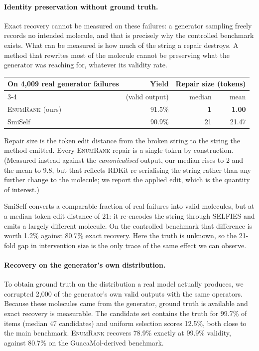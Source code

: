 \documentclass[journal=jcisd8,manuscript=article]{achemso}
\newcommand{\ours}{\textsc{EnumRank}}
\begin{document}
\paragraph{Identity preservation without ground truth.}
Exact recovery cannot be measured on these failures: a generator sampling
freely records no intended molecule, and that is precisely why the controlled
benchmark exists. What can be measured is how much of the string a repair destroys. A
method that rewrites most of the molecule cannot be preserving what the
generator was reaching for, whatever its validity rate.

\begin{center}\small
\begin{tabular}{lrrr}
\toprule
On 4{,}009 real generator failures & Yield & \multicolumn{2}{c}{Repair size (tokens)} \\
\cmidrule(l){3-4}
 & (valid output) & median & mean \\
\midrule
\ours{} (ours)              & 91.5\% & \textbf{1} & \textbf{1.00} \\
SmiSelf~\citep{smiself2025} & 90.9\% & 21 & 21.47 \\
\bottomrule
\end{tabular}
\end{center}

\noindent
Repair size is the token edit distance from the broken string to the string the
method emitted. Every \ours{} repair is a single token by construction.
(Measured instead against the \emph{canonicalised} output, our median rises to 2
and the mean to 9.8, but that reflects RDKit re-serialising the string rather
than any further change to the molecule; we report the applied edit, which is
the quantity of interest.)

SmiSelf converts a comparable fraction of real failures into valid molecules, but
at a median token edit distance of 21: it re-encodes the string through SELFIES
and emits a largely different molecule. On the controlled benchmark that
difference is worth 1.2\% against 80.7\% exact recovery. Here the truth is
unknown, so the 21-fold gap in intervention size is the only trace of the same
effect we can observe.

\paragraph{Recovery on the generator's own distribution.}
To obtain ground truth on the distribution a real model actually produces, we
corrupted 2{,}000 of the generator's own valid outputs with the same operators.
Because these molecules came from the generator, ground truth is available and
exact recovery is measurable. The candidate set contains the truth for 99.7\% of
items (median 47 candidates) and uniform selection scores 12.5\%, both close to
the main benchmark. \ours{} recovers 78.9\% exactly at 99.9\% validity, against
80.7\% on the GuacaMol-derived benchmark.
\end{document}
